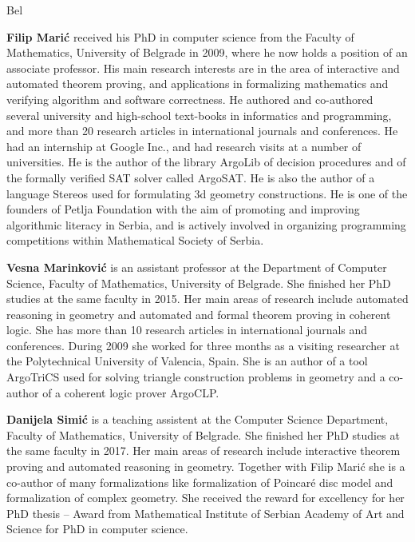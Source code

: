 \begin{sitedescription}{Bel}
\begin{compactitem}
  \item{\bf Filip Marić} received his PhD in computer science from the
    Faculty of Mathematics, University of Belgrade in 2009, where he
    now holds a position of an associate professor. His main research
    interests are in the area of interactive and automated theorem
    proving, and applications in formalizing mathematics and verifying
    algorithm and software correctness. He authored and co-authored
    several university and high-school text-books in informatics and
    programming, and more than 20 research articles in international
    journals and conferences. He had an internship at Google Inc., and
    had research visits at a number of universities. He is the author
    of the library ArgoLib of decision procedures and of the formally
    verified SAT solver called ArgoSAT. He is also the author of a
    language Stereos used for formulating 3d geometry
    constructions. He is one of the founders of Petlja Foundation with
    the aim of promoting and improving algorithmic literacy in Serbia,
    and is actively involved in organizing programming competitions
    within Mathematical Society of Serbia.

  \item{\bf Vesna Marinković} is an assistant professor at the
    Department of Computer Science, Faculty of Mathematics, University
    of Belgrade. She finished her PhD studies at the same faculty in
    2015. Her main areas of research include automated reasoning in
    geometry and automated and formal theorem proving in coherent
    logic. She has more than 10 research articles in international
    journals and conferences. During 2009 she worked for three months
    as a visiting researcher at the Polytechnical University of
    Valencia, Spain. She is an author of a tool ArgoTriCS used for
    solving triangle construction problems in geometry and a co-author
    of a coherent logic prover ArgoCLP.

  \item{\bf Danijela Simić} is a teaching assistent at the Computer
    Science Department, Faculty of Mathematics, University of
    Belgrade. She finished her PhD studies at the same faculty in
    2017. Her main areas of research include interactive theorem
    proving and automated reasoning in geometry. Together with Filip
    Marić she is a co-author of many formalizations like formalization
    of Poincaré disc model
    and formalization of complex geometry.
    She received the reward for excellency for her PhD thesis -- Award
    from Mathematical Institute of Serbian Academy of Art and Science
    for PhD in computer science.
  

\end{compactitem}
\end{sitedescription}
